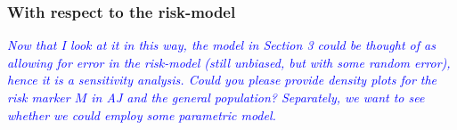 \documentclass[11pt]{article}
\begin{document}
\subsubsection{With respect to the risk-model}

\textcolor{blue}{\it Now that I look at it in this way, the model in Section 3 could be thought of as allowing for error in the risk-model (still unbiased, but with some random error), hence it is a sensitivity analysis. Could you please provide density plots for the risk marker $M$ in AJ and the general population? Separately, we want to see whether we could employ some parametric model.}

% 
% 
% 
\end{document}
